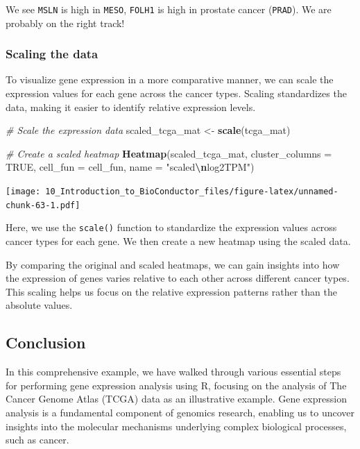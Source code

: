 \documentclass[
]{book}
\newenvironment{Shaded}{\begin{snugshade}}{\end{snugshade}}
\newcommand{\AttributeTok}[1]{\textcolor[rgb]{0.13,0.29,0.53}{#1}}
\newcommand{\CommentTok}[1]{\textcolor[rgb]{0.56,0.35,0.01}{\textit{#1}}}
\newcommand{\ConstantTok}[1]{\textcolor[rgb]{0.56,0.35,0.01}{#1}}
\newcommand{\FunctionTok}[1]{\textcolor[rgb]{0.13,0.29,0.53}{\textbf{#1}}}
\newcommand{\NormalTok}[1]{#1}
\newcommand{\OtherTok}[1]{\textcolor[rgb]{0.56,0.35,0.01}{#1}}
\newcommand{\SpecialCharTok}[1]{\textcolor[rgb]{0.81,0.36,0.00}{\textbf{#1}}}
\newcommand{\StringTok}[1]{\textcolor[rgb]{0.31,0.60,0.02}{#1}}
\begin{document}
We see \texttt{MSLN} is high in \texttt{MESO}, \texttt{FOLH1} is high in prostate cancer (\texttt{PRAD}). We are probably on the right track!

\hypertarget{scaling-the-data}{%
\subsubsection{Scaling the data}\label{scaling-the-data}}

To visualize gene expression in a more comparative manner, we can scale the expression values for each gene across the cancer types. Scaling standardizes the data, making it easier to identify relative expression levels.

\begin{Shaded}
\begin{Highlighting}[]
\CommentTok{\# Scale the expression data}
\NormalTok{scaled\_tcga\_mat }\OtherTok{\textless{}{-}} \FunctionTok{scale}\NormalTok{(tcga\_mat)}

\CommentTok{\# Create a scaled heatmap}
\FunctionTok{Heatmap}\NormalTok{(scaled\_tcga\_mat, }
        \AttributeTok{cluster\_columns =} \ConstantTok{TRUE}\NormalTok{, }
        \AttributeTok{cell\_fun =}\NormalTok{ cell\_fun, }
        \AttributeTok{name =} \StringTok{"scaled}\SpecialCharTok{\textbackslash{}n}\StringTok{log2TPM"}\NormalTok{)}
\end{Highlighting}
\end{Shaded}

\texttt{[image: 10\_Introduction\_to\_BioConductor\_files/figure-latex/unnamed-chunk-63-1.pdf]}

Here, we use the \texttt{scale()} function to standardize the expression values across cancer types for each gene. We then create a new heatmap using the scaled data.

By comparing the original and scaled heatmaps, we can gain insights into how the expression of genes varies relative to each other across different cancer types. This scaling helps us focus on the relative expression patterns rather than the absolute values.

\hypertarget{conclusion-30}{%
\subsection{Conclusion}\label{conclusion-30}}

In this comprehensive example, we have walked through various essential steps for performing gene expression analysis using R, focusing on the analysis of The Cancer Genome Atlas (TCGA) data as an illustrative example. Gene expression analysis is a fundamental component of genomics research, enabling us to uncover insights into the molecular mechanisms underlying complex biological processes, such as cancer.
\end{document}
